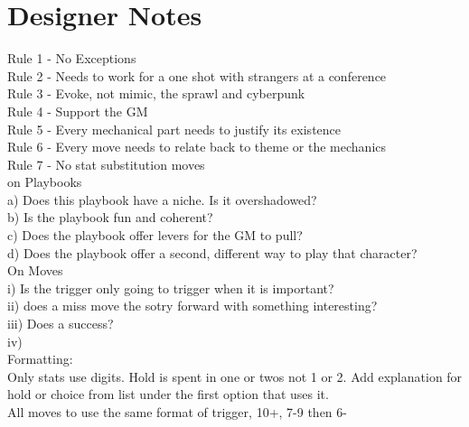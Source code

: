 \documentclass{tufte-book}
\begin{document}
\chapter{Designer Notes}

Rule 1 - No Exceptions\\
Rule 2 - Needs to work for a one shot with strangers at a conference\\
Rule 3 - Evoke, not mimic, the sprawl and cyberpunk\\
Rule 4 - Support the GM\\
Rule 5 - Every mechanical part needs to justify its existence\\
Rule 6 - Every move needs to relate back to theme or the mechanics\\
Rule 7 - No stat substitution moves\\

on Playbooks\\
a) Does this playbook have a niche. Is it overshadowed?\\
b) Is the playbook fun and coherent?\\
c) Does the playbook offer levers for the GM to pull?\\
d) Does the playbook offer a second, different way to play that character?\\

On Moves\\
i) Is the trigger only going to trigger when it is important?\\
ii) does a miss move the sotry forward with something interesting?\\
iii) Does a success?\\
iv) \\

Formatting:\\
Only stats use digits. Hold is spent in one or twos not 1 or 2. Add explanation for hold or choice from list under the first option that uses it.\\
All moves to use the same format of trigger, 10+, 7-9 then 6-\\









\backmatter




\printindex[stuff]

\printindex
\end{document}
